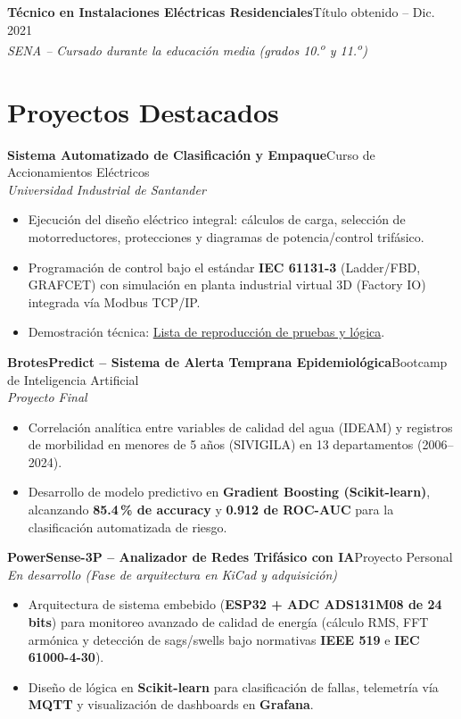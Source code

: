 \documentclass[10pt,a4paper]{article}
\newcommand{\entrada}[3]{%
    \noindent\textbf{\color{primario}#1}\hfill{\small\color{secundario}#2}\\[0pt]
    {\small\itshape\color{secundario}#3}\par\vspace{1pt}%
}
\begin{document}
\entrada{Técnico en Instalaciones Eléctricas Residenciales}{Título obtenido -- Dic. 2021}{SENA -- Cursado durante la educación media (grados 10.\textsuperscript{o} y 11.\textsuperscript{o})}

\section*{Proyectos Destacados}

\entrada{Sistema Automatizado de Clasificación y Empaque}{Curso de Accionamientos Eléctricos}{Universidad Industrial de Santander}
\begin{itemize}
    \item Ejecución del diseño eléctrico integral: cálculos de carga, selección de motorreductores, protecciones y diagramas de potencia/control trifásico.
    \item Programación de control bajo el estándar \textbf{IEC 61131-3} (Ladder/FBD, GRAFCET) con simulación en planta industrial virtual 3D (Factory IO) integrada vía Modbus TCP/IP.
    \item Demostración técnica: \href{https://youtube.com/playlist?list=PLUTAdDOdTlkNAtmTmna0_Z4TgAq-pZNoZ&si=ZV5tGop65upxRSAQ}{Lista de reproducción de pruebas y lógica}.
\end{itemize}
\vspace{1pt}

\entrada{BrotesPredict -- Sistema de Alerta Temprana Epidemiológica}{Bootcamp de Inteligencia Artificial}{Proyecto Final}
\begin{itemize}
    \item Correlación analítica entre variables de calidad del agua (IDEAM) y registros de morbilidad en menores de 5 años (SIVIGILA) en 13 departamentos (2006--2024).
    \item Desarrollo de modelo predictivo en \textbf{Gradient Boosting (Scikit-learn)}, alcanzando \textbf{85.4\,\% de accuracy} y \textbf{0.912 de ROC-AUC} para la clasificación automatizada de riesgo.
\end{itemize}
\vspace{1pt}

\entrada{PowerSense-3P -- Analizador de Redes Trifásico con IA}{Proyecto Personal}{En desarrollo (Fase de arquitectura en KiCad y adquisición)}
\begin{itemize}
    \item Arquitectura de sistema embebido (\textbf{ESP32 + ADC ADS131M08 de 24 bits}) para monitoreo avanzado de calidad de energía (cálculo RMS, FFT armónica y detección de sags/swells bajo normativas \textbf{IEEE 519} e \textbf{IEC 61000-4-30}).
    \item Diseño de lógica en \textbf{Scikit-learn} para clasificación de fallas, telemetría vía \textbf{MQTT} y visualización de dashboards en \textbf{Grafana}.
\end{itemize}
\end{document}
